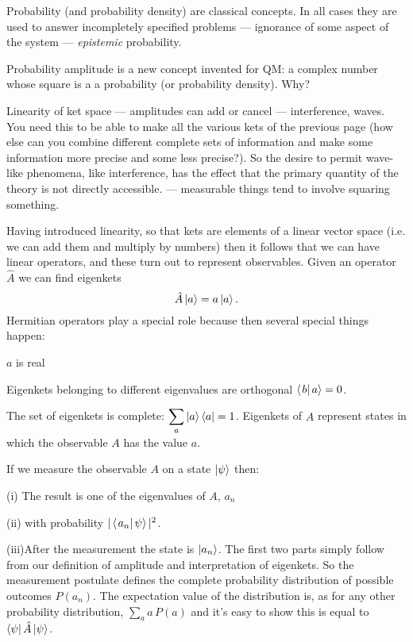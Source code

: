\noi Probability (and probability density) are classical concepts. In all
cases they are used to answer incompletely specified problems --- ignorance of
some aspect of the system --- {\it epistemic} probability.

\noi Probability amplitude is a new concept invented for QM: a complex
number whose square is a a probability (or probability density). Why?

\noi Linearity of ket space --- amplitudes can add or cancel ---
interference, waves. You need this to be able to make all the various kets of
the previous page (how else can you combine different complete sets of 
information and make some information more precise and some less precise?).
\medskip\noi
So the desire to permit wave-like phenomena, like interference, has the effect
that the primary quantity of the theory is not directly accessible. --- measurable
things tend to involve squaring something.
\vfil\Eject
{}

\noi Having introduced linearity, so that
kets are elements of a linear vector space (i.e. we can add them and multiply
by numbers) then it follows that we can have linear operators, and these turn
out to represent observables. Given an operator $\hat A$ we can find eigenkets
$$
\hat A\left| {a} \right>=a\left| {a} \right>.
$$
Hermitian operators play a special role because then several special things
happen:
\smallskip
\item{}$a$ is real
\item{} Eigenkets belonging to different eigenvalues are orthogonal
$\left< \left. {b} \right| {a} \right>=0$.
\item{} The set of eigenkets is complete: $\displaystyle
\sum_a\left| {a} \right>\left< {a} \right|=1$.
\smallskip
Eigenkets of $\hat A$ represent states in which the observable $A$ has the
value $a$. 
\vfil\Eject
{}

\noi
If we measure the observable $A$ on
a state $\left| {\psi} \right>$ then:
\medskip
\item{(i)} The result is one of the eigenvalues of $A$, $a_n$
\smallskip\item{(ii)} with probability $|\left< \left. {a_n} \right| {\psi} \right>|^2$.
\smallskip\item{(iii)}After the measurement the state is $\left| {a_n} \right>$.
\medskip\noi
The first two parts simply follow from our definition of amplitude and
interpretation of eigenkets. So the measurement postulate defines the complete
probability distribution of possible outcomes $P(a_n)$. The expectation value
of the distribution is, as for any other probability distribution,
$\sum_aa\,P(a)$ and it's easy to show this is equal to $\left< {\psi} \right|\hat
A\left| {\psi} \right>$.  

